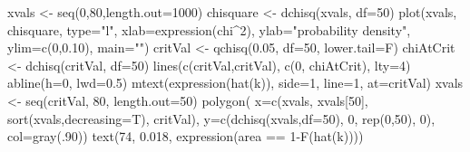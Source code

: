 \begin{Schunk}
\begin{Sinput}
 xvals <- seq(0,80,length.out=1000)
 chisquare <- dchisq(xvals, df=50)
 plot(xvals, chisquare, type="l", xlab=expression(chi^2), ylab="probability density",  ylim=c(0,0.10), main="")
 critVal <- qchisq(0.05, df=50, lower.tail=F)
 chiAtCrit <- dchisq(critVal, df=50)
 lines(c(critVal,critVal), c(0, chiAtCrit), lty=4)
 abline(h=0, lwd=0.5)
 mtext(expression(hat(k)), side=1, line=1, at=critVal)
 xvals <- seq(critVal, 80, length.out=50)
 polygon( x=c(xvals, xvals[50], sort(xvals,decreasing=T), critVal), 
        y=c(dchisq(xvals,df=50), 0, rep(0,50), 0), col=gray(.90)) 
 text(74, 0.018, expression(area == 1-F(hat(k))))
\end{Sinput}
\end{Schunk}
